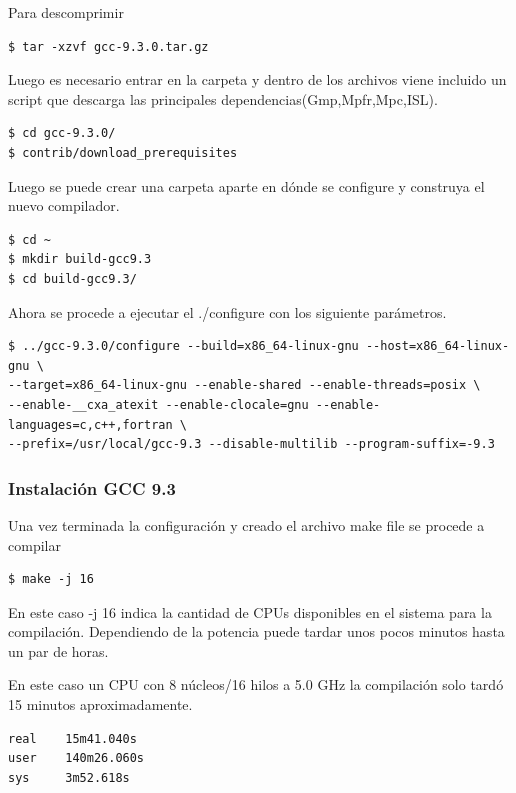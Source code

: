 \documentclass[12pt]{article}
\begin{document}
Para descomprimir
\begin{lstlisting}[frame=single,framexrightmargin=15pt]
$ tar -xzvf gcc-9.3.0.tar.gz
\end{lstlisting}

Luego es necesario entrar en la carpeta y dentro de los archivos viene incluido un script que descarga las principales dependencias(Gmp,Mpfr,Mpc,ISL).

\begin{lstlisting}[frame=single]
$ cd gcc-9.3.0/
$ contrib/download_prerequisites
\end{lstlisting}

Luego se puede crear una carpeta aparte en dónde se configure y construya el nuevo compilador.

\begin{lstlisting}[frame=single]
$ cd ~
$ mkdir build-gcc9.3
$ cd build-gcc9.3/
\end{lstlisting}

Ahora se procede a ejecutar el ./configure con los siguiente parámetros.
\begin{lstlisting}[frame=single]
$ ../gcc-9.3.0/configure --build=x86_64-linux-gnu --host=x86_64-linux-gnu \
--target=x86_64-linux-gnu --enable-shared --enable-threads=posix \
--enable-__cxa_atexit --enable-clocale=gnu --enable-languages=c,c++,fortran \
--prefix=/usr/local/gcc-9.3 --disable-multilib --program-suffix=-9.3
\end{lstlisting}


\subsubsection{Instalación GCC 9.3}

Una vez terminada la configuración y creado el archivo make file se procede a compilar

\begin{lstlisting}[frame=single]
$ make -j 16
\end{lstlisting}
En este caso -j 16 indica la cantidad de CPUs disponibles en el sistema para la compilación. Dependiendo de la potencia puede tardar unos pocos minutos hasta un par de horas.

En este caso un CPU con 8 núcleos/16 hilos a 5.0 GHz la compilación solo tardó 15 minutos aproximadamente. 

\begin{lstlisting}[frame=single]
real    15m41.040s
user    140m26.060s
sys     3m52.618s
\end{lstlisting}
\end{document}
